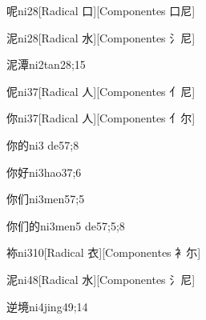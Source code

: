 \begin{verbete}{呢}{ni2}{8}[Radical 口][Componentes 口尼]
\end{verbete}

\begin{verbete}{泥}{ni2}{8}[Radical 水][Componentes 氵尼]
\end{verbete}

\begin{verbete}{泥潭}{ni2tan2}{8;15}
\end{verbete}

\begin{verbete}{伲}{ni3}{7}[Radical 人][Componentes 亻尼]
\end{verbete}

\begin{verbete}{你}{ni3}{7}[Radical 人][Componentes 亻尔]
\end{verbete}

\begin{verbete}{你的}{ni3 de5}{7;8}
\end{verbete}

\begin{verbete}{你好}{ni3hao3}{7;6}
\end{verbete}

\begin{verbete}{你们}{ni3men5}{7;5}
\end{verbete}

\begin{verbete}{你们的}{ni3men5 de5}{7;5;8}
\end{verbete}

\begin{verbete}{袮}{ni3}{10}[Radical 衣][Componentes 衤尓]
\end{verbete}

\begin{verbete}{泥}{ni4}{8}[Radical 水][Componentes 氵尼]
\end{verbete}

\begin{verbete}{逆境}{ni4jing4}{9;14}
\end{verbete}


